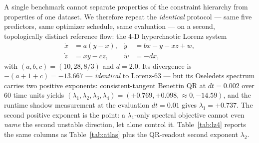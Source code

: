 \documentclass[journal]{IEEEtran}
\begin{document}
A single benchmark cannot separate properties of the constraint
hierarchy from properties of one dataset. We therefore repeat the
\emph{identical} protocol --- same five predictors, same optimizer
schedule, same evaluation --- on a second, topologically distinct
reference flow: the 4-D hyperchaotic Lorenz system \cite{qi2008hyperchaos}
\begin{equation}
\label{eq:lz4}
\begin{aligned}
  \dot x&=a(y-x), & \dot y&=bx-y-xz+w,\\
  \dot z&=xy-cz, & \dot w&=-dx,
\end{aligned}
\end{equation}
with $(a,b,c)=(10,28,8/3)$ and $d=2.0$. Its divergence is
$-(a+1+c)=-13.667$ --- \emph{identical} to Lorenz-63 --- but its
Oseledets spectrum carries two positive exponents: consistent-tangent
Benettin QR at $dt=0.002$ over 60 time units yields
$(\lambda_1,\lambda_2,\lambda_3,\lambda_4)=(+0.769,+0.098,\approx0,-14.59)$,
and the runtime shadow measurement at the evaluation $dt=0.01$ gives
$\lambda_1=+0.737$. The second positive exponent is the point: a
$\lambda_1$-only spectral objective cannot even \emph{name} the second
unstable direction, let alone control it. Table~\ref{tab:lz4} reports the
same columns as Table~\ref{tab:atlas} plus the QR-readout second
exponent $\lambda_2$.
\end{document}
